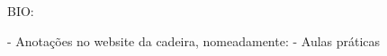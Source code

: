 \documentclass{article}
\begin{document}
    

    BIO:

    - Anotações no website da cadeira, nomeadamente:
        - Aulas práticas
\end{document}
